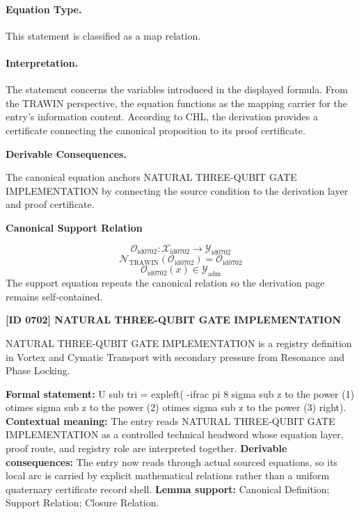 \paragraph{Equation Type.}
This statement is classified as a map relation.

\paragraph{Interpretation.}
The statement concerns the variables introduced in the displayed formula. From the TRAWIN perspective, the equation functions as the mapping carrier for the entry’s information content. According to CHL, the derivation provides a certificate connecting the canonical proposition to its proof certificate.

\par\vspace{0.35em}
\noindent\textbf{Derivable Consequences.}\quad
\begingroup
\footnotesize
\raggedright
The canonical equation anchors NATURAL THREE-QUBIT GATE IMPLEMENTATION by connecting the source condition to the derivation layer and proof certificate.
\par\endgroup

\noindent\textbf{Canonical Support Relation}\par
\[
\mathcal{O}_{\mathrm{id0702}}:\mathcal{X}_{\mathrm{id0702}}\longrightarrow\mathcal{Y}_{\mathrm{id0702}}
\]
\[
\mathcal{N}_{\mathrm{TRAWIN}}(\mathcal{O}_{\mathrm{id0702}})=\mathcal{O}_{\mathrm{id0702}}
\]
\[
\mathcal{O}_{\mathrm{id0702}}(x)\in\mathcal{Y}_{\mathrm{adm}}
\]
\noindent The support equation repeats the canonical relation so the derivation page remains self-contained.\par

\clearpage
\noindent\textbf{[ID 0702] NATURAL THREE-QUBIT GATE IMPLEMENTATION}\par
\vspace{0.35em}
\begingroup\small
{}
NATURAL THREE-QUBIT GATE IMPLEMENTATION is a registry definition in Vortex and Cymatic Transport with secondary pressure from Resonance and Phase Locking.

\begingroup\footnotesize\setlength{\emergencystretch}{3em}\sloppy
\textbf{Formal statement:} U sub tri = expleft( -ifrac pi 8 sigma sub z to the power (1) otimes sigma sub z to the power (2) otimes sigma sub z to the power (3) right). \textbf{Contextual meaning:} The entry reads NATURAL THREE-QUBIT GATE IMPLEMENTATION as a controlled technical headword whose equation layer, proof route, and registry role are interpreted together. \textbf{Derivable consequences:} The entry now reads through actual sourced equations, so its local arc is carried by explicit mathematical relations rather than a uniform quaternary certificate record shell. \textbf{Lemma support:} Canonical Definition; Support Relation; Closure Relation.\par
\endgroup

